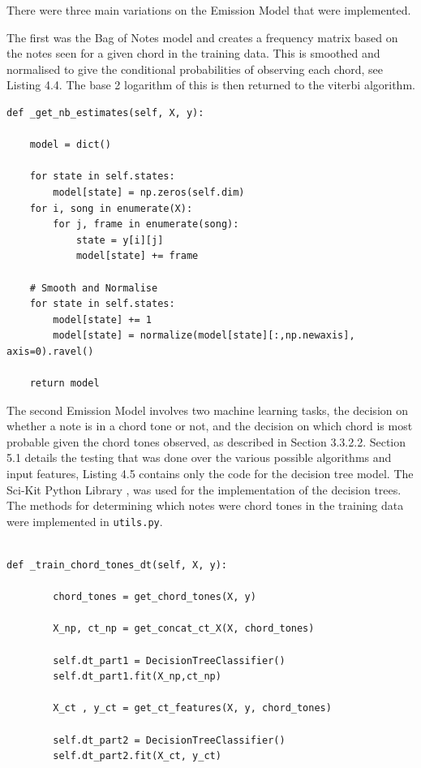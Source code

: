 \documentclass[bsc,singlespacing,parskip,deptreport,twoside,frontabs]{infthesis}
\begin{document}
There were three main variations on the Emission Model that were implemented.

The first was the Bag of Notes model and creates a frequency matrix based on the notes seen for a given chord in the training data. This is smoothed and normalised to give the conditional probabilities of observing each chord, see Listing 4.4. The base 2 logarithm of this is then returned to the viterbi algorithm.

\begin{lstlisting}[frame=single,caption='Emission Model - Bag of Notes']
def _get_nb_estimates(self, X, y):

	model = dict()

	for state in self.states:
		model[state] = np.zeros(self.dim)
	for i, song in enumerate(X):
		for j, frame in enumerate(song):
			state = y[i][j]
			model[state] += frame

	# Smooth and Normalise
	for state in self.states:
		model[state] += 1
		model[state] = normalize(model[state][:,np.newaxis], axis=0).ravel()

	return model

\end{lstlisting}

The second Emission Model involves two machine learning tasks, the decision on whether a note is in a chord tone or not, and the decision on which chord is most probable given the chord tones observed, as described in Section 3.3.2.2. Section 5.1 details the testing that was done over the various possible algorithms and input features, Listing 4.5 contains only the code for the decision tree model. The Sci-Kit Python Library \cite[]{pedregosa2011scikit}, was used for the implementation of the decision trees. The methods for determining which notes were chord tones in the training data were implemented in {\tt utils.py}.

\begin{lstlisting}[frame=single,caption='Emission Model - Chord Tones']

def _train_chord_tones_dt(self, X, y):

		chord_tones = get_chord_tones(X, y)

		X_np, ct_np = get_concat_ct_X(X, chord_tones)

		self.dt_part1 = DecisionTreeClassifier()
		self.dt_part1.fit(X_np,ct_np)

		X_ct , y_ct = get_ct_features(X, y, chord_tones)

		self.dt_part2 = DecisionTreeClassifier()
		self.dt_part2.fit(X_ct, y_ct)

\end{lstlisting}
\end{document}
